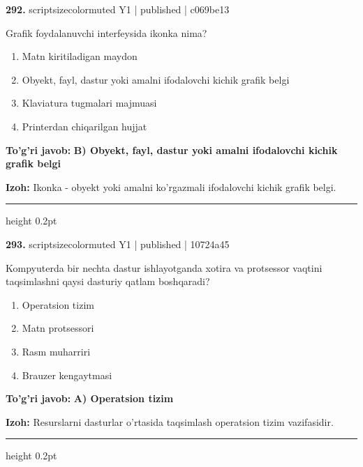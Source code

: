 \documentclass[10pt,a4paper]{article}
\begin{document}
{\bfseries\sffamily\color{ink} 292.} {scriptsizecolor{muted} Y1 | published | c069be13}
\par
Grafik foydalanuvchi interfeysida ikonka nima?
\begin{enumerate}[label=\Alph*),leftmargin=9mm]
\item Matn kiritiladigan maydon
\item Obyekt, fayl, dastur yoki amalni ifodalovchi kichik grafik belgi
\item Klaviatura tugmalari majmuasi
\item Printerdan chiqarilgan hujjat
\end{enumerate}
\begin{tcolorbox}[enhanced,breakable,colback=teal!4,colframe=teal!60!black,boxrule=0.45pt,arc=1.2mm,left=2.7mm,right=2.7mm,top=1.8mm,bottom=1.8mm,before skip=2mm,after skip=2mm]
{\bfseries\sffamily\color{teal}To'g'ri javob:} \textbf{B) Obyekt, fayl, dastur yoki amalni ifodalovchi kichik grafik belgi}
\par\smallskip
{\bfseries Izoh:} Ikonka - obyekt yoki amalni ko'rgazmali ifodalovchi kichik grafik belgi.
\end{tcolorbox}
\vspace{2mm}\hrule height 0.2pt\vspace{3mm}

{\bfseries\sffamily\color{ink} 293.} {scriptsizecolor{muted} Y1 | published | 10724a45}
\par
Kompyuterda bir nechta dastur ishlayotganda xotira va protsessor vaqtini taqsimlashni qaysi dasturiy qatlam boshqaradi?
\begin{enumerate}[label=\Alph*),leftmargin=9mm]
\item Operatsion tizim
\item Matn protsessori
\item Rasm muharriri
\item Brauzer kengaytmasi
\end{enumerate}
\begin{tcolorbox}[enhanced,breakable,colback=teal!4,colframe=teal!60!black,boxrule=0.45pt,arc=1.2mm,left=2.7mm,right=2.7mm,top=1.8mm,bottom=1.8mm,before skip=2mm,after skip=2mm]
{\bfseries\sffamily\color{teal}To'g'ri javob:} \textbf{A) Operatsion tizim}
\par\smallskip
{\bfseries Izoh:} Resurslarni dasturlar o'rtasida taqsimlash operatsion tizim vazifasidir.
\end{tcolorbox}
\vspace{2mm}\hrule height 0.2pt\vspace{3mm}
\end{document}
